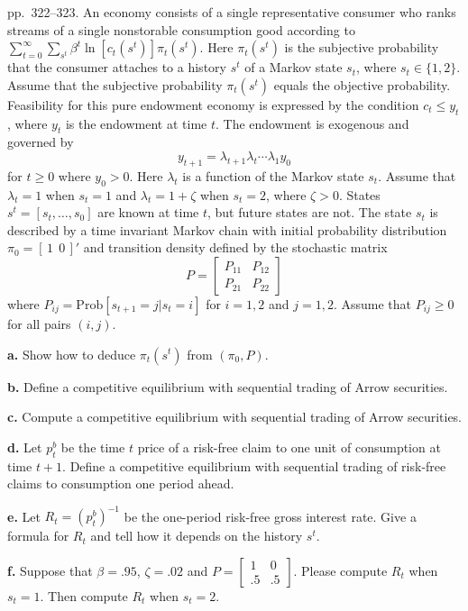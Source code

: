 \documentclass[12pt, letterpaper]{article}
\begin{document}
\begin{tcolorbox}[evenbox,title={Exercise 8.20 \quad Risk-free bonds}]
\begin{tcolorbox}[questionbox]
pp.~322--323. An economy consists of a single representative consumer who ranks streams of a single
nonstorable consumption good according to $\sum_{t=0}^\infty\sum_{s^t}\beta^t\ln[c_t(s^t)]\pi_t(s^t)$. Here $\pi_t(s^t)$
is the subjective probability that the consumer attaches to a history $s^t$ of a Markov state $s_t$, where
$s_t\in\{1,2\}$. Assume that the subjective probability $\pi_t(s^t)$ equals the objective probability. Feasibility
for this pure endowment economy is expressed by the condition $c_t\le y_t$, where $y_t$ is the endowment at
time $t$. The endowment is exogenous and governed by
\[
y_{t+1}=\lambda_{t+1}\lambda_t\cdots\lambda_1y_0
\]
for $t\ge0$ where $y_0>0$. Here $\lambda_t$ is a function of the Markov state $s_t$. Assume that $\lambda_t=1$ when
$s_t=1$ and $\lambda_t=1+\zeta$ when $s_t=2$, where $\zeta>0$. States $s^t=[s_t,\dots,s_0]$ are known at time $t$,
but future states are not. The state $s_t$ is described by a time invariant Markov chain with initial
probability distribution $\pi_0=[\,1\ \ 0\,]'$ and transition density defined by the stochastic matrix
\[
P=\begin{bmatrix}P_{11}&P_{12}\\P_{21}&P_{22}\end{bmatrix}
\]
where $P_{ij}=\mathrm{Prob}[s_{t+1}=j|s_t=i]$ for $i=1,2$ and $j=1,2$. Assume that $P_{ij}\ge0$ for all pairs $(i,j)$.

\textbf{a.} Show how to deduce $\pi_t(s^t)$ from $(\pi_0,P)$.

\textbf{b.} Define a competitive equilibrium with sequential trading of Arrow securities.

\textbf{c.} Compute a competitive equilibrium with sequential trading of Arrow securities.

\textbf{d.} Let $p^b_t$ be the time $t$ price of a risk-free claim to one unit of consumption at time $t+1$. Define a
competitive equilibrium with sequential trading of risk-free claims to consumption one period ahead.

\textbf{e.} Let $R_t=(p^b_t)^{-1}$ be the one-period risk-free gross interest rate. Give a formula for $R_t$ and
tell how it depends on the history $s^t$.

\textbf{f.} Suppose that $\beta=.95$, $\zeta=.02$ and $P=\begin{bmatrix}1&0\\.5&.5\end{bmatrix}$. Please compute $R_t$
when $s_t=1$. Then compute $R_t$ when $s_t=2$.


\end{tcolorbox}
\end{tcolorbox}
\end{document}

